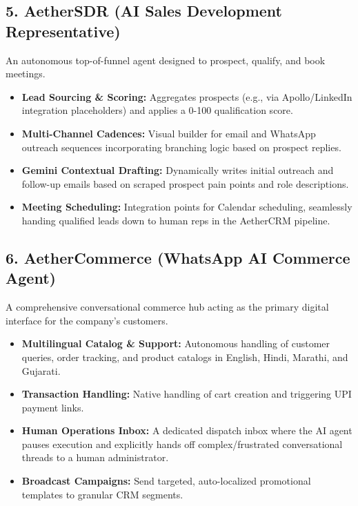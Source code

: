 \documentclass[12pt,a4paper]{article}
\begin{document}
\subsection{5. AetherSDR (AI Sales Development Representative)}
An autonomous top-of-funnel agent designed to prospect, qualify, and book meetings.
\begin{itemize}[label=\textcolor{AetherLavender}{\textbullet}]
    \item \textbf{Lead Sourcing \& Scoring:} Aggregates prospects (e.g., via Apollo/LinkedIn integration placeholders) and applies a 0-100 qualification score.
    \item \textbf{Multi-Channel Cadences:} Visual builder for email and WhatsApp outreach sequences incorporating branching logic based on prospect replies.
    \item \textbf{Gemini Contextual Drafting:} Dynamically writes initial outreach and follow-up emails based on scraped prospect pain points and role descriptions.
    \item \textbf{Meeting Scheduling:} Integration points for Calendar scheduling, seamlessly handing qualified leads down to human reps in the AetherCRM pipeline.
\end{itemize}

\subsection{6. AetherCommerce (WhatsApp AI Commerce Agent)}
A comprehensive conversational commerce hub acting as the primary digital interface for the company's customers.
\begin{itemize}[label=\textcolor{AetherLavender}{\textbullet}]
    \item \textbf{Multilingual Catalog \& Support:} Autonomous handling of customer queries, order tracking, and product catalogs in English, Hindi, Marathi, and Gujarati.
    \item \textbf{Transaction Handling:} Native handling of cart creation and triggering UPI payment links.
    \item \textbf{Human Operations Inbox:} A dedicated dispatch inbox where the AI agent pauses execution and explicitly hands off complex/frustrated conversational threads to a human administrator.
    \item \textbf{Broadcast Campaigns:} Send targeted, auto-localized promotional templates to granular CRM segments.
\end{itemize}
\end{document}
